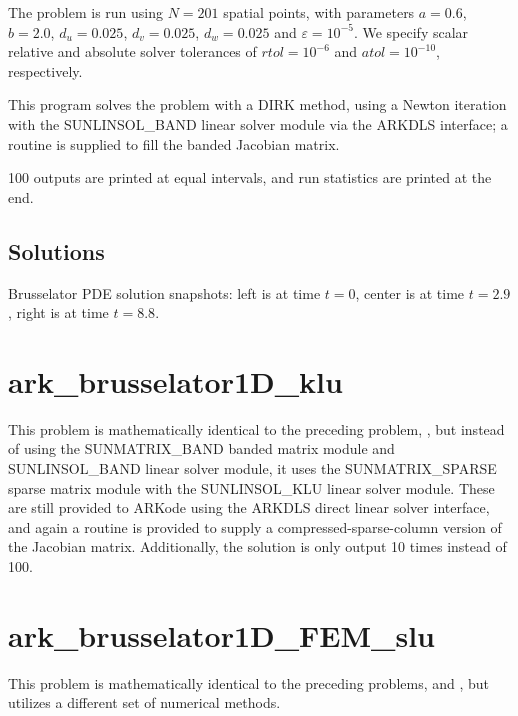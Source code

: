 \documentclass[letterpaper,10pt,english]{sphinxmanual}
\begin{document}
The problem is run using \(N=201\) spatial points, with parameters
\(a=0.6\), \(b=2.0\), \(d_u=0.025\), \(d_v=0.025\),
\(d_w=0.025\) and \(\varepsilon=10^{-5}\).  We specify scalar
relative and absolute solver tolerances of \(rtol=10^{-6}\) and
\(atol=10^{-10}\), respectively.

This program solves the problem with a DIRK method, using a Newton
iteration with the SUNLINSOL\_BAND linear solver module via the ARKDLS
interface; a routine is supplied to fill the banded Jacobian matrix.

100 outputs are printed at equal intervals, and run statistics
are printed at the end.


\subsection{Solutions}
\label{\detokenize{c_serial:id20}}
\noindent{}

\noindent{}

\noindent{}

Brusselator PDE solution snapshots: left is at time \(t=0\),
center is at time \(t=2.9\), right is at time \(t=8.8\).


\section{ark\_brusselator1D\_klu}
\label{\detokenize{c_serial:id21}}\label{\detokenize{c_serial:ark-brusselator1d-klu}}
This problem is mathematically identical to the preceding problem,
{\hyperref[\detokenize{c_serial:ark-brusselator1d}]{}}, but instead of using the SUNMATRIX\_BAND
banded matrix module and SUNLINSOL\_BAND linear solver module, it uses
the SUNMATRIX\_SPARSE sparse matrix module with the SUNLINSOL\_KLU
linear solver module.  These are still provided to ARKode using the
ARKDLS direct linear solver interface, and again a routine is provided
to supply a compressed-sparse-column version of the Jacobian matrix.
Additionally, the solution is only output 10 times instead of 100.


\section{ark\_brusselator1D\_FEM\_slu}
\label{\detokenize{c_serial:ark-brusselator1d-fem-slu}}\label{\detokenize{c_serial:id22}}
This problem is mathematically identical to the preceding problems,
{\hyperref[\detokenize{c_serial:ark-brusselator1d}]{}} and {\hyperref[\detokenize{c_serial:ark-brusselator1d-klu}]{}}, but
utilizes a different set of numerical methods.
\end{document}
